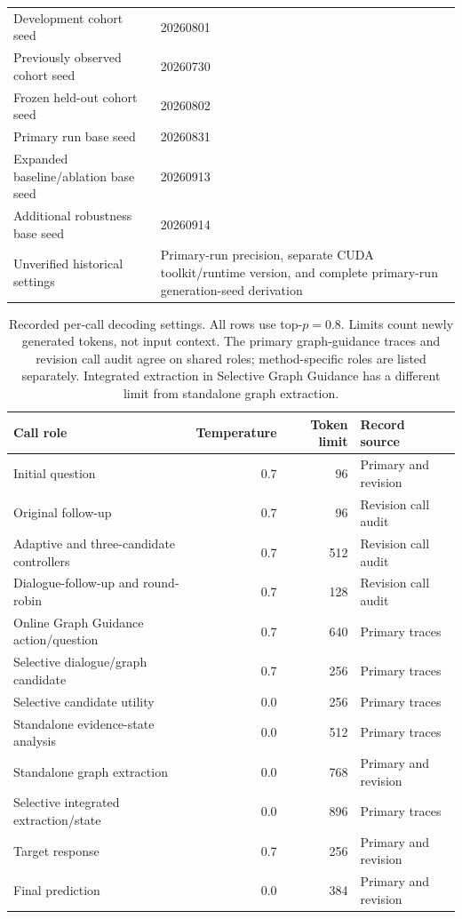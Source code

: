 \documentclass{ieeeaccess}
\begin{document}
\begin{table}[H]
\begin{tabularx}{\textwidth}{@{}p{} X@{}}
Development cohort seed & 20260801 \\
Previously observed cohort seed & 20260730 \\
Frozen held-out cohort seed & 20260802 \\
Primary run base seed & 20260831 \\
Expanded baseline/ablation base seed & 20260913 \\
Additional robustness base seed & 20260914 \\
Unverified historical settings & Primary-run precision, separate CUDA toolkit/runtime version, and complete primary-run generation-seed derivation \\
\bottomrule
\end{tabularx}
\end{table}

\renewcommand{\thetable}{S4b}
\begin{table}[H]
\centering
\footnotesize
\renewcommand{\arraystretch}{1.12}
\caption{Recorded per-call decoding settings. All rows use top-$p=0.8$.
Limits count newly generated tokens, not input context. The primary graph-guidance
traces and revision call audit agree on shared roles; method-specific roles are
listed separately. Integrated extraction in Selective Graph Guidance has a different
limit from standalone graph extraction.}
\label{tab:call-decoding-settings}
\begin{tabularx}{\textwidth}{@{}Xrrp{}@{}}
\toprule
Call role & Temperature & Token limit & Record source \\
\midrule
Initial question & 0.7 & 96 & Primary and revision \\
Original follow-up & 0.7 & 96 & Revision call audit \\
Adaptive and three-candidate controllers & 0.7 & 512 & Revision call audit \\
Dialogue-follow-up and round-robin & 0.7 & 128 & Revision call audit \\
Online Graph Guidance action/question & 0.7 & 640 & Primary traces \\
Selective dialogue/graph candidate & 0.7 & 256 & Primary traces \\
Selective candidate utility & 0.0 & 256 & Primary traces \\
Standalone evidence-state analysis & 0.0 & 512 & Primary traces \\
Standalone graph extraction & 0.0 & 768 & Primary and revision \\
Selective integrated extraction/state & 0.0 & 896 & Primary traces \\
Target response & 0.7 & 256 & Primary and revision \\
Final prediction & 0.0 & 384 & Primary and revision \\
\bottomrule
\end{tabularx}
\end{table}
\end{document}
